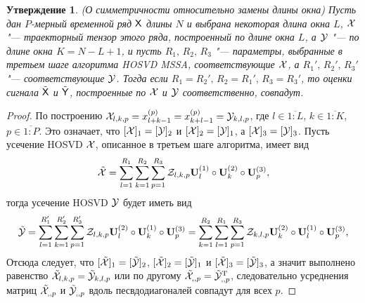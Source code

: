\documentclass[specialist,
    substylefile = spbu_report.rtx,
    subf,href,colorlinks=true, 12pt]{disser}
\theoremstyle{plain}
\newtheorem{statement}{Утверждение}[section]
\theoremstyle{definition}
\theoremstyle{remark}
\begin{document}
    \begin{statement}
        \emph{(О симметричности относительно замены длины окна)}
        Пусть дан $P$-мерный временной ряд $\mathsf{X}$ длины $N$ и выбрана некоторая длина окна $L$,
        $\mathcal{X}$ "--- траекторный тензор этого ряда, построенный по длине окна $L$, а
        $\mathcal{Y}$ "--- по длине окна ${K = N - L + 1}$, и пусть
        $R_1,\, R_2,\, R_3$ "--- параметры, выбранные в третьем шаге алгоритма \emph{HOSVD MSSA}, соответствующие $\mathcal{X}$,
        а $R_1',\, R_2',\, R_3'$ "--- соответствующие $\mathcal{Y}$.
        Тогда если $R_1 = R_2',\, R_2 = R_1',\,  R_3 = R_3'$, то
        оценки сигнала $\tilde{\mathsf{X}}$ и $\tilde{\mathsf{Y}}$, построенные по $\mathcal{X}$ и $\mathcal{Y}$ соответственно,
        совпадут.
    \end{statement}
    \begin{proof}
        По построению $\mathcal{X}_{l,k,p} = x_{l+k-1}^{(p)} = x_{k+l-1}^{(p)} = \mathcal{Y}_{k,l,p}$, где ${l\in \overline{1:L}}$,
        ${k \in \overline{1:K}}$, ${p\in \overline{1:P}}$.
        Это означает, что $[\mathcal{X}]_1 = [\mathcal{Y}]_2$ и $[\mathcal{X}]_2 = [\mathcal{Y}]_1$, а $[\mathcal{X}]_3 = [\mathcal{Y}]_3$.
        Пусть усечение HOSVD $\mathcal{X}$, описанное в третьем шаге алгоритма, имеет вид
        \[
            \tilde{\mathcal{X}} = \sum_{l=1}^{R_1} \sum_{k=1}^{R_2} \sum_{p=1}^{R_3}
            \mathcal{Z}_{l,k,p} \mathbf{U}_l^{(1)}\circ \mathbf{U}_k^{(2)} \circ \mathbf{U}_p^{(3)},
        \]
        тогда усечение HOSVD $\mathcal{Y}$ будет иметь вид
        \[
            \tilde{\mathcal{Y}} = \sum_{l=1}^{R_1'} \sum_{k=1}^{R_2'} \sum_{p=1}^{R_3'}
            \mathcal{Z}_{l,k,p} \mathbf{U}_l^{(2)}\circ \mathbf{U}_k^{(1)} \circ \mathbf{U}_p^{(3)}
            = \sum_{k=1}^{R_2} \sum_{l=1}^{R_1} \sum_{p=1}^{R_3}
            \mathcal{Z}_{k,l,p} \mathbf{U}_k^{(2)}\circ \mathbf{U}_l^{(1)} \circ \mathbf{U}_p^{(3)},
        \]
        Отсюда следует, что $[\tilde{\mathcal{X}}]_1 = [\tilde{\mathcal{Y}}]_2$, $[\tilde{\mathcal{X}}]_2 = [\tilde{\mathcal{Y}}]_1$ и
        $[\tilde{\mathcal{X}}]_3 = [\tilde{\mathcal{Y}}]_3$, а значит выполнено равенство
        $\tilde{\mathcal{X}}_{l,k,p}=\tilde{\mathcal{Y}}_{k,l,p}$ или по другому $\tilde{\mathcal{X}}_{,,p} = \tilde{\mathcal{Y}}_{,,p}^{\mathrm{T}}$,
        следовательно усреднения матриц $\tilde{\mathcal{X}}_{,,p}$ и $\tilde{\mathcal{Y}}_{,,p}$ вдоль песвдодиагоналей совпадут
        для всех $p$.
    \end{proof}
\end{document}
